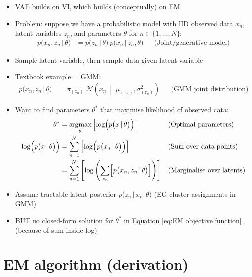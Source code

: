 \documentclass{article}
\begin{document}
\begin{itemize}
    \item VAE builds on VI, which builds (conceptually) on EM
    \item Problem: suppose we have a probabilistic model with IID observed data $x_n$, latent variables $z_n$, and parameters $\theta$ for $n\in\{1,\dots,N\}$:
    \begin{align}
        p\bigl(x_n, z_n \,\vert\, \theta\bigr) &= p\bigl( z_n \,\vert\, \theta \bigr)\;p\bigl( x_n \,\vert\, z_n, \theta \bigr) && \text{(Joint/generative model)}
    \end{align}
    \item Sample latent variable, then sample data given latent variable
    \item Textbook example = GMM:
    \begin{align}
        p\bigl(x_n, z_n \,\vert\, \theta\bigr) &= \pi_{(z_n)}\;\mathcal{N}\left( x_n \;\middle\vert\; \mu_{(z_n)}, \sigma_{(z_n)}^2 \right) && \text{(GMM joint distribution)}
    \end{align}
    \item Want to find parameters $\theta^*$ that maximise likelihood of observed data:
    \begin{align}
        \theta^* &= \underset{\theta}{\text{argmax}}\left[ \log\Bigl( p\bigl(x \,\vert\, \theta\bigr) \Bigr) \right] && \text{(Optimal parameters)} \\
        \log\Bigl( p\bigl(x \,\vert\, \theta\bigr) \Bigr) &= \sum_{n=1}^N \left[ \log\Bigl( p\bigl(x_n \,\vert\, \theta\bigr) \Bigr) \right] && \text{(Sum over data points)} \\
        &= \sum_{n=1}^N \left[ \log\left( \sum_{z_n} \Bigl[ p\bigl(x_n, z_n \,\vert\, \theta\bigr) \Bigr] \right) \right] && \text{(Marginalise over latents)} \label{eq:EM objective function}
    \end{align}
    \item Assume tractable latent posterior $p\bigl( z_n \,\vert\, x_n, \theta \bigr)$ (EG cluster assignments in GMM)
    \item BUT no closed-form solution for $\theta^*$ in Equation \ref{eq:EM objective function} (because of sum inside log)
\end{itemize}

\newpage
\section{EM algorithm (derivation)}
\end{document}

